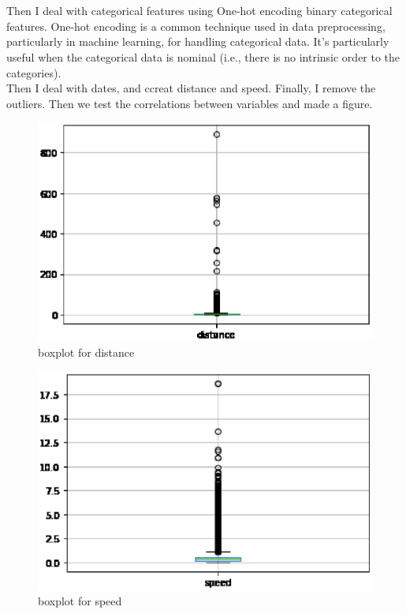 \\
\\
Then I deal with categorical features using One-hot encoding binary categorical features. One-hot encoding is a common technique used in data preprocessing, particularly in machine learning, for handling categorical data. It’s particularly useful when the categorical data is nominal (i.e., there is no intrinsic order to the
categories). 
\\
Then I deal with dates, and ccreat distance and speed. Finally, I remove the outliers. Then we test the correlations between variables and made a figure.
\begin{figure}[h]
	\centering
	\includegraphics[scale=0.3]{distance.eps}
	\caption{boxplot for distance}
\end{figure}
\begin{figure}[h]
	\centering
	\includegraphics[scale=0.3]{speed.eps}
	\caption{boxplot for speed}
\end{figure}
